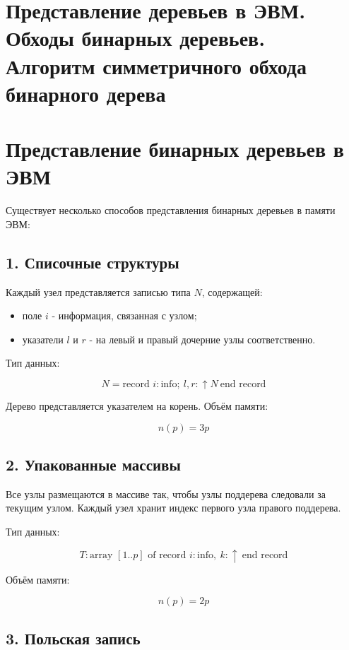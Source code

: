 {
	\section{Представление деревьев в ЭВМ. Обходы бинарных деревьев. Алгоритм
симметричного обхода бинарного дерева}

\section*{Представление бинарных деревьев в ЭВМ}

Существует несколько способов представления бинарных деревьев в памяти ЭВМ:

\subsection*{1. Списочные структуры}

Каждый узел представляется записью типа $N$, содержащей:
\begin{itemize}
  \item поле $i$ - информация, связанная с узлом;
  \item указатели $l$ и $r$ - на левый и правый дочерние узлы соответственно.
\end{itemize}

Тип данных:


\[
N = \text{record } i : \text{info};\ l, r : \uparrow N\ \text{end record}
\]



Дерево представляется указателем на корень.  
Объём памяти:


\[
n(p) = 3p
\]



\subsection*{2. Упакованные массивы}

Все узлы размещаются в массиве так, чтобы узлы поддерева следовали за текущим узлом.  
Каждый узел хранит индекс первого узла правого поддерева.

Тип данных:


\[
T : \text{array } [1..p] \text{ of record } i : \text{info},\ k : \uparrow\ \text{end record}
\]



Объём памяти:


\[
n(p) = 2p
\]



\subsection*{3. Польская запись}

}
